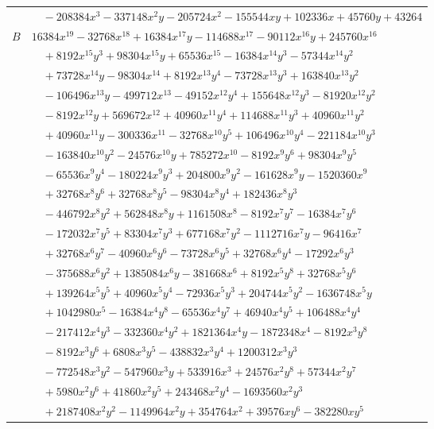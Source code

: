 \documentclass[11pt]{article}
\begin{document}
\begin{longtable}{@{}ll@{}}
 & $\quad -208384x^{3}-337148x^{2}y-205724x^{2}-155544xy+102336x+45760y+43264$\\
$B$ & $16384x^{19}-32768x^{18}+16384x^{17}y-114688x^{17}-90112x^{16}y+245760x^{16}$\\
 & $\quad +8192x^{15}y^{3}+98304x^{15}y+65536x^{15}-16384x^{14}y^{3}-57344x^{14}y^{2}$\\
 & $\quad +73728x^{14}y-98304x^{14}+8192x^{13}y^{4}-73728x^{13}y^{3}+163840x^{13}y^{2}$\\
 & $\quad -106496x^{13}y-499712x^{13}-49152x^{12}y^{4}+155648x^{12}y^{3}-81920x^{12}y^{2}$\\
 & $\quad -8192x^{12}y+569672x^{12}+40960x^{11}y^{4}+114688x^{11}y^{3}+40960x^{11}y^{2}$\\
 & $\quad +40960x^{11}y-300336x^{11}-32768x^{10}y^{5}+106496x^{10}y^{4}-221184x^{10}y^{3}$\\
 & $\quad -163840x^{10}y^{2}-24576x^{10}y+785272x^{10}-8192x^{9}y^{6}+98304x^{9}y^{5}$\\
 & $\quad -65536x^{9}y^{4}-180224x^{9}y^{3}+204800x^{9}y^{2}-161628x^{9}y-1520360x^{9}$\\
 & $\quad +32768x^{8}y^{6}+32768x^{8}y^{5}-98304x^{8}y^{4}+182436x^{8}y^{3}$\\
 & $\quad -446792x^{8}y^{2}+562848x^{8}y+1161508x^{8}-8192x^{7}y^{7}-16384x^{7}y^{6}$\\
 & $\quad -172032x^{7}y^{5}+83304x^{7}y^{3}+677168x^{7}y^{2}-1112716x^{7}y-96416x^{7}$\\
 & $\quad +32768x^{6}y^{7}-40960x^{6}y^{6}-73728x^{6}y^{5}+32768x^{6}y^{4}-17292x^{6}y^{3}$\\
 & $\quad -375688x^{6}y^{2}+1385084x^{6}y-381668x^{6}+8192x^{5}y^{8}+32768x^{5}y^{6}$\\
 & $\quad +139264x^{5}y^{5}+40960x^{5}y^{4}-72936x^{5}y^{3}+204744x^{5}y^{2}-1636748x^{5}y$\\
 & $\quad +1042980x^{5}-16384x^{4}y^{8}-65536x^{4}y^{7}+46940x^{4}y^{5}+106488x^{4}y^{4}$\\
 & $\quad -217412x^{4}y^{3}-332360x^{4}y^{2}+1821364x^{4}y-1872348x^{4}-8192x^{3}y^{8}$\\
 & $\quad -8192x^{3}y^{6}+6808x^{3}y^{5}-438832x^{3}y^{4}+1200312x^{3}y^{3}$\\
 & $\quad -772548x^{3}y^{2}-547960x^{3}y+533916x^{3}+24576x^{2}y^{8}+57344x^{2}y^{7}$\\
 & $\quad +5980x^{2}y^{6}+41860x^{2}y^{5}+243468x^{2}y^{4}-1693560x^{2}y^{3}$\\
 & $\quad +2187408x^{2}y^{2}-1149964x^{2}y+354764x^{2}+39576xy^{6}-382280xy^{5}$\\

\end{longtable}
\end{document}
